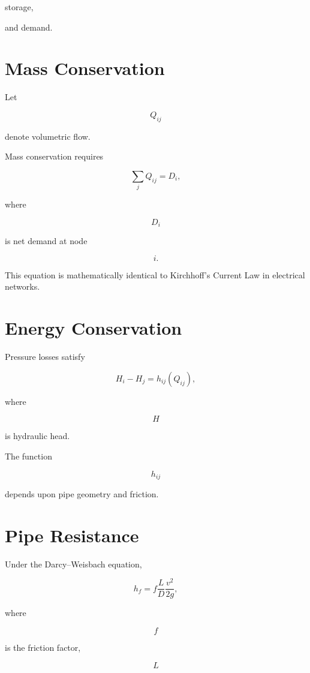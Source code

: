 \documentclass[11pt,fleqn]{book}
\numberwithin{equation}{chapter}
\theoremstyle{plain}
\theoremstyle{definition}
\theoremstyle{remark}
\begin{document}
storage,

and demand.


\section{Mass Conservation}

Let

\[
Q_{ij}
\]

denote volumetric flow.

Mass conservation requires

\[
\boxed{
\sum_j
Q_{ij}
=
D_i,
}
\]

where

\[
D_i
\]

is net demand at node

\[
i.
\]

This equation is mathematically identical to Kirchhoff's Current Law in
electrical networks.


\section{Energy Conservation}

Pressure losses satisfy

\[
\boxed{
H_i-H_j
=
h_{ij}(Q_{ij}),
}
\]

where

\[
H
\]

is hydraulic head.

The function

\[
h_{ij}
\]

depends upon pipe geometry and friction.


\section{Pipe Resistance}

Under the Darcy--Weisbach equation,

\[
h_f
=
f
\frac{L}{D}
\frac{v^2}{2g},
\]

where

\[
f
\]

is the friction factor,

\[
L
\]
\end{document}
